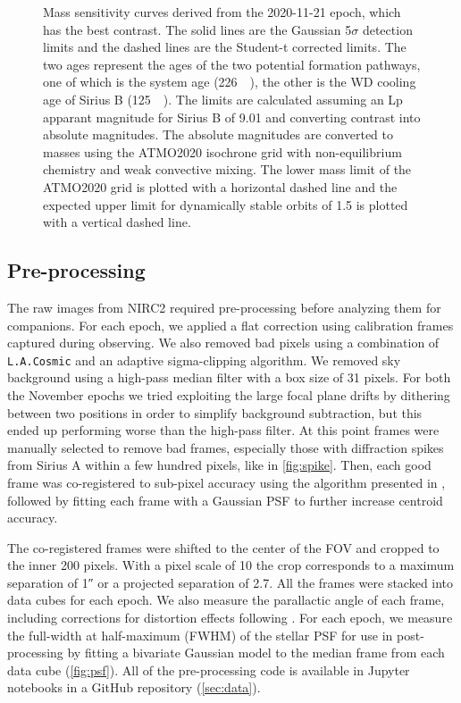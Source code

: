 \documentclass[twocolumn,linenumbers]{aastex631}
\begin{document}
\begin{figure*}
    \centering
    \caption{Mass sensitivity curves derived from the 2020-11-21 epoch, which has the best contrast. The solid lines are the Gaussian 5$\sigma$ detection limits and the dashed lines are the Student-t corrected limits. The two ages represent the ages of the two potential formation pathways, one of which is the system age (\qty{226}{\mega\year}), the other is the WD cooling age of Sirius B (\qty{125}{\mega\year}). The limits are calculated assuming an Lp apparant magnitude for Sirius B of \num{9.01} and converting contrast into absolute magnitudes. The absolute magnitudes are converted to masses using the ATMO2020 isochrone grid with non-equilibrium chemistry and weak convective mixing. The lower mass limit of the ATMO2020 grid is plotted with a horizontal dashed line and the expected upper limit for dynamically stable orbits of \qty{1.5}{\au} is plotted with a vertical dashed line.}
    \label{fig:mass}
\end{figure*}

\subsection{Pre-processing}

The raw images from NIRC2 required pre-processing before analyzing them for companions. For each epoch, we applied a flat correction using calibration frames captured during observing. We also removed bad pixels using a combination of \texttt{L.A.Cosmic} \citep{vandokkumCosmicRayRejectionLaplacian2001a} and an adaptive sigma-clipping algorithm. We removed sky background using a high-pass median filter with a box size of 31 pixels. For both the November epochs we tried exploiting the large focal plane drifts by dithering between two positions in order to simplify background subtraction, but this ended up performing worse than the high-pass filter. At this point frames were manually selected to remove bad frames, especially those with diffraction spikes from Sirius A within a few hundred pixels, like in \cref{fig:spike}. Then, each good frame was co-registered to sub-pixel accuracy using the algorithm presented in \citet{guizar-sicairosEfficientSubpixelImage2008}, followed by fitting each frame with a Gaussian PSF to further increase centroid accuracy.

The co-registered frames were shifted to the center of the FOV and cropped to the inner 200 pixels. With a pixel scale of \qty{10}{\milliarcsecond} the crop corresponds to a maximum separation of \ang{;;1} or a projected separation of \qty{2.7}{\au}. All the frames were stacked into data cubes for each epoch. We also measure the parallactic angle of each frame, including corrections for distortion effects following \citet{yeldaImprovingGalacticCenter2010}. For each epoch, we measure the full-width at half-maximum (FWHM) of the stellar PSF for use in post-processing by fitting a bivariate Gaussian model to the median frame from each data cube (\cref{fig:psf}). All of the pre-processing code is available in Jupyter notebooks in a GitHub repository (\cref{sec:data}).
\end{document}

